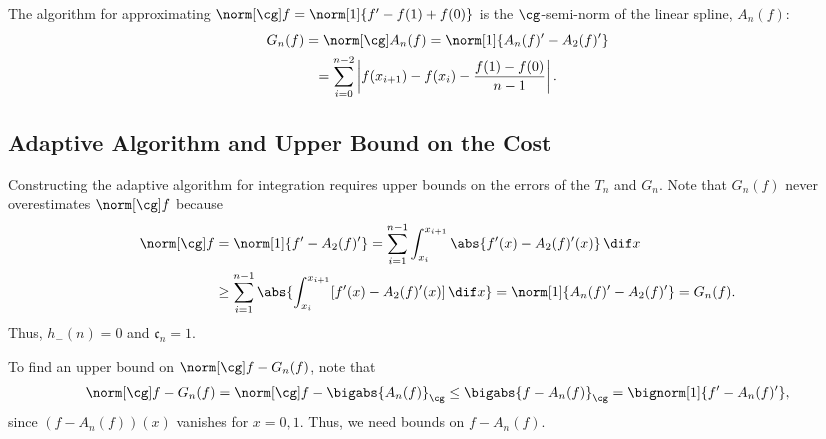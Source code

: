 The algorithm for approximating $\Gnorm{f}=\norm[1]{f'-f(1)+f(0)}$ is the $\cg$-semi-norm of the linear spline, $A_n(f)$:
\begin{multline}\label{1direst}
    G_n(f)=\Gnorm{A_n(f)}=\norm[1]{A_n(f)'-A_2(f)'} \\
    =\sum_{i=0}^{n-2}\left|f(x_{i+1})-f(x_{i}) - \frac{f(1)-f(0)}{n-1}\right|.
\end{multline} 

\subsection{Adaptive Algorithm and Upper Bound on the Cost}

Constructing the adaptive algorithm for integration requires upper bounds on the errors of the $T_n$ and $G_n$.  Note that $G_{n}(f)$ never overestimates $\Gnorm{f}$ because 
\begin{align*}
\Gnorm{f} & = \norm[1]{f'-A_2(f)'} 
= \sum_{i=1}^{n-1} \int_{x_i}^{x_{i+1}} \abs{f'(x) - A_2(f)'(x)} \, \dif x \\
& \ge \sum_{i=1}^{n-1} \abs{\int_{x_i}^{x_{i+1}} [f'(x) - A_2(f)'(x)] \, \dif x}=\norm[1]{A_n(f)'-A_2(f)'} = G_n(f).
\end{align*}
Thus, $h_{-}(n)=0$ and $\mathfrak{c}_n=1$. 

To find an upper bound on $\Gnorm{f}-G_{n}(f)$, note that 
\begin{equation*}
\Gnorm{f} - G_{n}(f) = \Gnorm{f} - \bigabs{A_n(f)}_{\cg} \le \bigabs{f-A_n(f)}_{\cg} = \bignorm[1]{f' -A_n(f)'},
\end{equation*}
since $(f-A_n(f))(x)$ vanishes for $x=0,1$.  Thus, we need bounds on $f-A_n(f)$.


